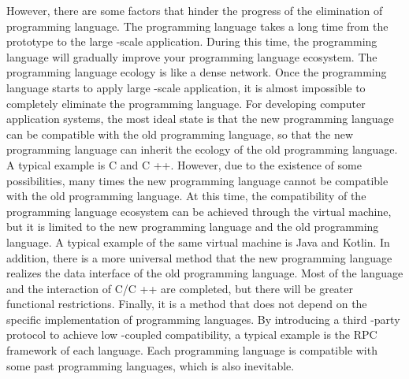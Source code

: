 However, there are some factors that hinder the progress of the elimination of programming language. The programming language takes a long time from the prototype to the large -scale application. During this time, the programming language will gradually improve your programming language ecosystem. The programming language ecology is like a dense network. Once the programming language starts to apply large -scale application, it is almost impossible to completely eliminate the programming language. For developing computer application systems, the most ideal state is that the new programming language can be compatible with the old programming language, so that the new programming language can inherit the ecology of the old programming language. A typical example is C and C ++. However, due to the existence of some possibilities, many times the new programming language cannot be compatible with the old programming language. At this time, the compatibility of the programming language ecosystem can be achieved through the virtual machine, but it is limited to the new programming language and the old programming language. A typical example of the same virtual machine is Java and Kotlin. In addition, there is a more universal method that the new programming language realizes the data interface of the old programming language. Most of the language and the interaction of C/C ++ are completed, but there will be greater functional restrictions. Finally, it is a method that does not depend on the specific implementation of programming languages. By introducing a third -party protocol to achieve low -coupled compatibility, a typical example is the RPC framework of each language. Each programming language is compatible with some past programming languages, which is also inevitable.

